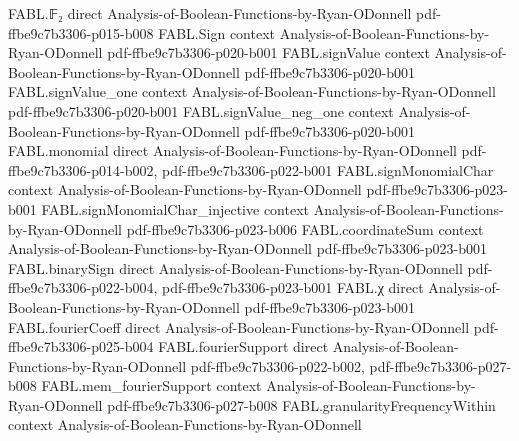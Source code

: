 \begin{theorem}
\label{FABL.BooleanCircuit.toWidthThreeCNF_eval_iff_exists}
\leanok
{}
\proofstep
  {FABL.𝔽₂}
  {direct}
  {Analysis-of-Boolean-Functions-by-Ryan-ODonnell}
  {pdf-ffbe9c7b3306-p015-b008}
\proofstep
  {FABL.Sign}
  {context}
  {Analysis-of-Boolean-Functions-by-Ryan-ODonnell}
  {pdf-ffbe9c7b3306-p020-b001}
\proofstep
  {FABL.signValue}
  {context}
  {Analysis-of-Boolean-Functions-by-Ryan-ODonnell}
  {pdf-ffbe9c7b3306-p020-b001}
\proofstep
  {FABL.signValue_one}
  {context}
  {Analysis-of-Boolean-Functions-by-Ryan-ODonnell}
  {pdf-ffbe9c7b3306-p020-b001}
\proofstep
  {FABL.signValue_neg_one}
  {context}
  {Analysis-of-Boolean-Functions-by-Ryan-ODonnell}
  {pdf-ffbe9c7b3306-p020-b001}
\proofstep
  {FABL.monomial}
  {direct}
  {Analysis-of-Boolean-Functions-by-Ryan-ODonnell}
  {pdf-ffbe9c7b3306-p014-b002,
    pdf-ffbe9c7b3306-p022-b001}
\proofstep
  {FABL.signMonomialChar}
  {context}
  {Analysis-of-Boolean-Functions-by-Ryan-ODonnell}
  {pdf-ffbe9c7b3306-p023-b001}
\proofstep
  {FABL.signMonomialChar_injective}
  {context}
  {Analysis-of-Boolean-Functions-by-Ryan-ODonnell}
  {pdf-ffbe9c7b3306-p023-b006}
\proofstep
  {FABL.coordinateSum}
  {context}
  {Analysis-of-Boolean-Functions-by-Ryan-ODonnell}
  {pdf-ffbe9c7b3306-p023-b001}
\proofstep
  {FABL.binarySign}
  {direct}
  {Analysis-of-Boolean-Functions-by-Ryan-ODonnell}
  {pdf-ffbe9c7b3306-p022-b004,
    pdf-ffbe9c7b3306-p023-b001}
\proofstep
  {FABL.χ}
  {direct}
  {Analysis-of-Boolean-Functions-by-Ryan-ODonnell}
  {pdf-ffbe9c7b3306-p023-b001}
\proofstep
  {FABL.fourierCoeff}
  {direct}
  {Analysis-of-Boolean-Functions-by-Ryan-ODonnell}
  {pdf-ffbe9c7b3306-p025-b004}
\proofstep
  {FABL.fourierSupport}
  {direct}
  {Analysis-of-Boolean-Functions-by-Ryan-ODonnell}
  {pdf-ffbe9c7b3306-p022-b002,
    pdf-ffbe9c7b3306-p027-b008}
\proofstep
  {FABL.mem_fourierSupport}
  {context}
  {Analysis-of-Boolean-Functions-by-Ryan-ODonnell}
  {pdf-ffbe9c7b3306-p027-b008}
\proofstep
  {FABL.granularityFrequencyWithin}
  {context}
  {Analysis-of-Boolean-Functions-by-Ryan-ODonnell}

\end{theorem}
